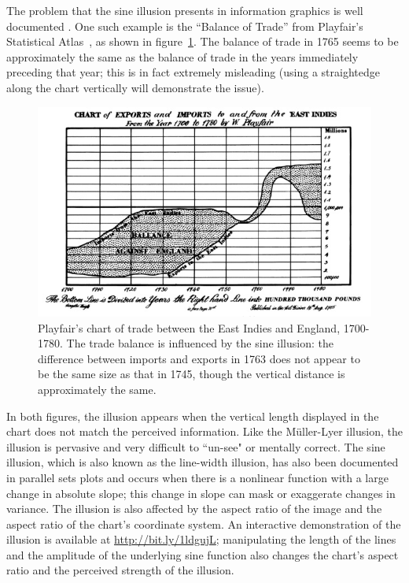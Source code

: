 \documentclass[11pt]{isuthesis}\usepackage[]{graphicx}\usepackage[]{color}
\begin{document}
The problem that the sine illusion presents in information graphics is well documented \citep{cleveland:1984, robbins:2005}. One such example is the ``Balance of Trade'' from Playfair's Statistical Atlas~\citep{playfair}, as shown in figure~\ref{fig:playfair}. The balance of trade in 1765 seems to be approximately the same as the balance of trade in the years immediately preceding that year; this is in fact extremely misleading (using a straightedge along the chart vertically will demonstrate the issue).%



\begin{figure}[t]\centering
\includegraphics[keepaspectratio=TRUE,width=5in]{PlayfairExportImports}
\caption{Playfair's chart of trade between the East Indies and England, 1700-1780. The trade balance is influenced by the sine illusion: the difference between imports and exports in 1763 does not appear to be the same size as that in 1745, though the vertical distance is approximately the same.}\label{fig:playfair}
\end{figure}

In both figures, the illusion appears when the vertical length displayed in the chart does not match the perceived information. Like the M\"uller-Lyer illusion, the illusion is pervasive and very difficult to ``un-see" or mentally correct. The sine illusion, which is also known as the line-width illusion, has also been documented in parallel sets plots \citep{parallelsets} and occurs when there is a nonlinear function with a large change in absolute slope; this change in slope can mask or exaggerate changes in variance. The illusion is also affected by the aspect ratio of the image and the aspect ratio of the chart's coordinate system. An interactive demonstration of the illusion is available at \url{http://bit.ly/1ldgujL}; manipulating the length of the lines and the amplitude of the underlying sine function also changes the chart's aspect ratio and the perceived strength of the illusion. 
\end{document}
